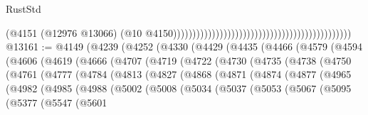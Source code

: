 \begin{lexlean}{RustStd}
\begin{coremodule}
                                                                                            (@4151
                                                                                              (@12976
                                                                                                @13066)
                                                                                              (@10
                                                                                                @4150))))))))))))))))))))))))))))))))))))))))))))))
@13161 := @4149
    (@4239
      (@4252
        (@4330
          (@4429
            (@4435
              (@4466
                (@4579
                  (@4594
                    (@4606
                      (@4619
                        (@4666
                          (@4707
                            (@4719
                              (@4722
                                (@4730
                                  (@4735
                                    (@4738
                                      (@4750
                                        (@4761
                                          (@4777
                                            (@4784
                                              (@4813
                                                (@4827
                                                  (@4868
                                                    (@4871
                                                      (@4874
                                                        (@4877
                                                          (@4965
                                                            (@4982
                                                              (@4985
                                                                (@4988
                                                                  (@5002
                                                                    (@5008
                                                                      (@5034
                                                                        (@5037
                                                                          (@5053
                                                                            (@5067
                                                                              (@5095
                                                                                (@5377
                                                                                  (@5547
                                                                                    (@5601

\end{coremodule}
\end{lexlean}
